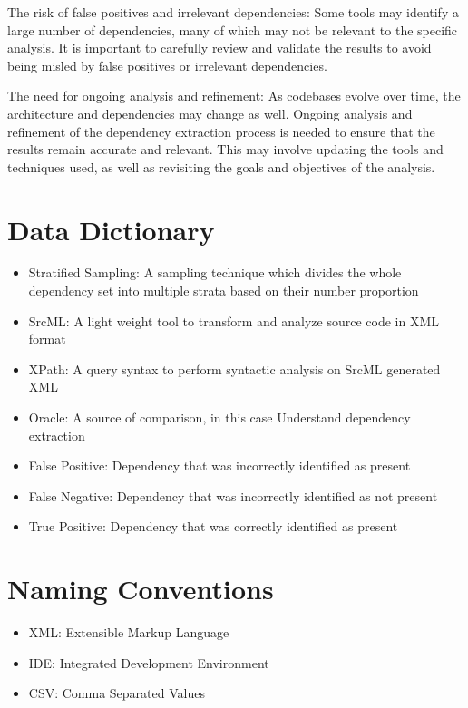 \documentclass[12pt, dvipsnames, a4paper]{article}
\begin{document}
The risk of false positives and irrelevant dependencies: Some tools may identify a large number of dependencies, many of which may not be relevant to the specific analysis. It is important to carefully review and validate the results to avoid being misled by false positives or irrelevant dependencies.

The need for ongoing analysis and refinement: As codebases evolve over time, the architecture and dependencies may change as well. Ongoing analysis and refinement of the dependency extraction process is needed to ensure that the results remain accurate and relevant. This may involve updating the tools and techniques used, as well as revisiting the goals and objectives of the analysis.
\clearpage
\section{Data Dictionary}
\begin{itemize}
	\item{Stratified Sampling: A sampling technique which divides the whole dependency set into multiple strata based on their number proportion}
	\item {SrcML: A light weight tool to transform and analyze source code in XML format}
	\item {XPath: A query syntax to perform syntactic analysis on SrcML generated XML}
	\item {Oracle: A source of comparison, in this case Understand dependency extraction}
	\item {False Positive: Dependency that was incorrectly identified as present}
	\item {False Negative: Dependency that was incorrectly identified as not present}
	\item {True Positive: Dependency that was correctly identified as present}
\end{itemize}

\section{Naming Conventions}
\begin{itemize}
	\item {XML: Extensible Markup Language}
	\item {IDE: Integrated Development Environment}
	\item {CSV: Comma Separated Values}
\end{itemize}
\end{document}
